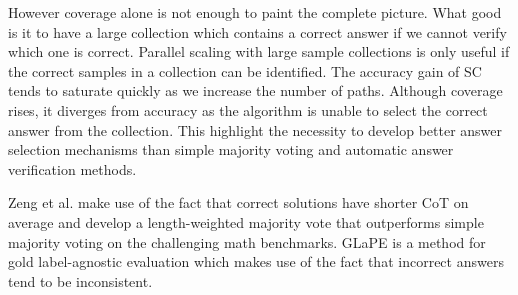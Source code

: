 However coverage alone is not enough to paint the complete picture. What good is it to have a large collection which contains a correct answer
if we cannot verify which one is correct. Parallel scaling with large sample collections is only useful 
if the correct samples in a collection can be identified\cite{brown2024largelanguagemonkeysscaling}\cite{zeng2025revisitingtesttimescalingo1like}.
The accuracy gain of SC tends to saturate quickly as we increase the number of paths\cite{wang2023selfconsistencyimproveschainthought}.
Although coverage rises, it diverges\cite{brown2024largelanguagemonkeysscaling} from accuracy as the algorithm is unable to select the correct answer from the collection.
This highlight the necessity to develop better answer selection mechanisms than simple majority voting and automatic answer verification methods.

Zeng et al.\cite{zeng2025revisitingtesttimescalingo1like} make use of the fact that
correct solutions have shorter CoT on average and develop a length-weighted majority vote that outperforms simple majority voting on 
the challenging math benchmarks. GLaPE\cite{zhang2024glapegoldlabelagnosticprompt} is a method for gold label-agnostic evaluation which makes use
of the fact that incorrect answers tend to be inconsistent. 

